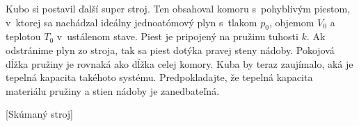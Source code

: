 Kubo si postavil ďalší super stroj. Ten obsahoval komoru s~pohyblivým piestom, v~ktorej sa nachádzal ideálny jednoatómový plyn
s~tlakom $p_0$, objemom $V_0$ a teplotou $T_0$ v~ustálenom stave. Piest je pripojený na pružinu tuhosti $k$. Ak odstránime plyn
zo stroja, tak sa piest dotýka pravej steny nádoby. Pokojová dĺžka pružiny je rovnaká ako dĺžka celej komory. 
Kuba by teraz zaujímalo, aká je tepelná kapacita takéhoto systému. 
Predpokladajte, že tepelná kapacita materiálu pružiny a stien nádoby je zanedbateľná.

[Skúmaný stroj]
